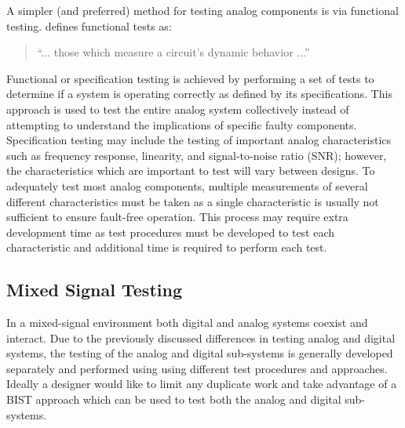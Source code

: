 \documentclass[12pt]{report}
\begin{document}
A simpler (and preferred\cite{syschip}) method for testing analog components is via functional testing. \cite{milor} defines functional tests as: 
\begin{quote}
``... those which measure a circuit's dynamic behavior ...\cite{milor}''
\end{quote}
Functional or specification testing is achieved by performing a set of tests to determine if a system is operating correctly as defined by its specifications.  This approach is used to test the entire analog system collectively instead of attempting to understand the implications of specific faulty components\cite{analogmixedtest}.  Specification testing may include the testing of important analog characteristics such as frequency response, linearity, and signal-to-noise ratio (SNR)\cite{syschip}; however, the characteristics which are important  to test will vary between designs.  To adequately test most analog components, multiple measurements of several different characteristics must be taken as a single characteristic is usually not sufficient to ensure fault-free operation\cite{analogmixedtest}.  This process may require extra development time as test procedures must be developed to test each characteristic and additional time is required to perform each test\cite{analogmixedtest}.

\subsection{Mixed Signal Testing}
\label{sct:MixedSignal}
In a mixed-signal environment both digital and analog systems coexist and interact.  Due to the previously discussed differences in testing analog and digital systems, the testing of the analog and digital sub-systems is generally developed separately and performed using using different test procedures and approaches\cite{analogmixedtest}.  Ideally a designer would like to limit any duplicate work and take advantage of a BIST approach which can be used to test both the analog and digital sub-systems.
\end{document}
